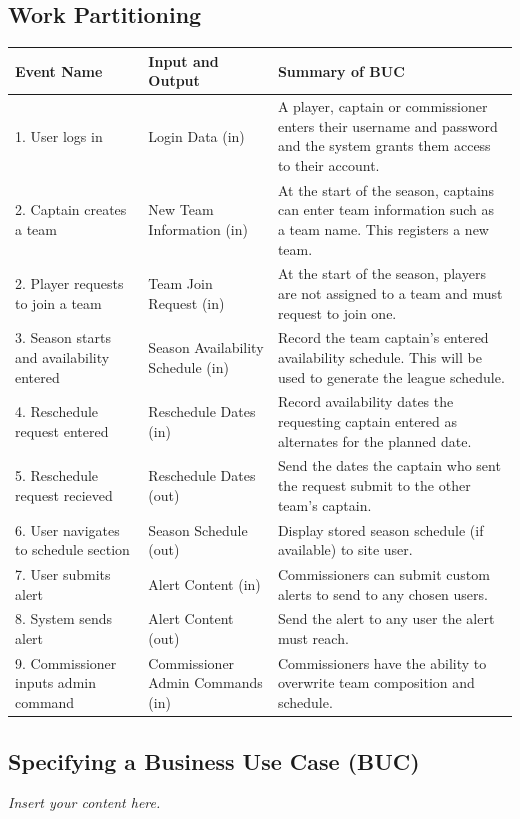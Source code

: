 \documentclass[12pt]{article}
\newcommand{\lips}{\textit{Insert your content here.}}
\begin{document}
\subsection{Work Partitioning}
  \begin{center}
    \begin{tabular}{|m{4cm}|m{4cm}|m{6cm}|}
      \hline
      Event Name & Input and Output & Summary of BUC\\
      \hline
      1. User logs in & Login Data (in) & A player, captain or commissioner
      enters their username and password and the system grants them access to
      their account.\\
      2. Captain creates a team & New Team Information (in) & At the
      start of the season, captains can enter team information such as a team
      name. This registers a new team.\\
      2. Player requests to join a team & Team Join Request (in) & At the
      start of the season, players are not assigned to a team and must request
      to join one.\\
      3. Season starts and availability entered & Season Availability Schedule
      (in) & Record the team captain's entered availability schedule. This
      will be used to generate the league schedule.\\
      4. Reschedule request entered & Reschedule Dates (in) & Record
      availability dates the requesting captain entered as alternates for the
      planned date.\\
      5. Reschedule request recieved & Reschedule Dates (out) & Send the dates
      the captain who sent the request submit to the other team's captain.\\
      6. User navigates to schedule section & Season Schedule (out) & Display
      stored season schedule (if available) to site user.\\
      7. User submits alert & Alert Content (in) & Commissioners can submit custom
      alerts to send to any chosen users.\\
      8. System sends alert & Alert Content (out) & Send the alert to any user the
      alert must reach.\\
      9. Commissioner inputs admin command & Commissioner Admin Commands (in)
      & Commissioners have the ability to overwrite team composition and
      schedule.\\
      \hline
    \end{tabular}
  \end{center}
\subsection{Specifying a Business Use Case (BUC)}
\lips
\end{document}
